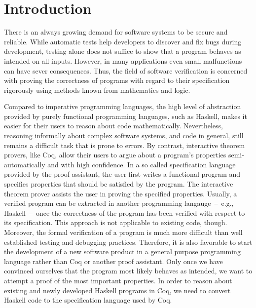 \chapter{Introduction} \label{chp:introduction}
There is an always growing demand for software systems to be secure and reliable.
While automatic tests help developers to discover and fix bugs during development, testing alone does not suffice to show that a program behaves as intended on all inputs.
However, in many applications even small malfunctions can have sever consequences.
Thus, the field of software verification is concerned with proving the correctness of programs with regard to their specification rigorously using methods known from mathematics and logic.

Compared to imperative programming languages, the high level of abstraction provided by purely functional programming languages, such as Haskell, makes it easier for their users to reason about code mathematically.
Nevertheless, reasoning informally about complex software systems, and code in general, still remains a difficult task that is prone to errors.
By contrast, interactive theorem provers, like Coq, allow their users to argue about a program's properties semi-automatically and with high confidence.
In a so called specification language provided by the proof assistant, the user first writes a functional program and specifies properties that should be satisfied by the program.
The interactive theorem prover assists the user in proving the specified properties.
Usually, a verified program can be extracted in another programming langauge~--~e.g., Haskell~--~once the correctness of the program has been verified with respect to its specification.
This approach is not applicable to existing code, though.
Moreover, the formal verification of a program is much more difficult than well established testing and debugging practices.
Therefore, it is also favorable to start the development of a new software product in a general purpose programming language rather than Coq or another proof assistant.
Only once we have convinced ourselves that the program most likely behaves as intended, we want to attempt a proof of the most important properties.
In order to reason about existing and newly developed Haskell programs in Coq, we need to convert Haskell code to the specification language used by Coq.

